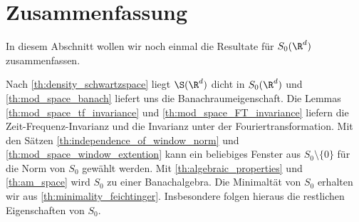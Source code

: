 \section{Zusammenfassung}
In diesem Abschnitt wollen wir noch einmal die Resultate für $ S_0(\R^d) $ zusammenfassen.

Nach \ref{th:density_schwartzspace} liegt $ \S(\R^d) $ dicht in $ S_0(\R^d) $ und \ref{th:mod_space_banach} liefert uns die Banachraumeigenschaft.
Die Lemmas \ref{th:mod_space_tf_invariance} und \ref{th:mod_space_FT_invariance} liefern die Zeit-Frequenz-Invarianz und die Invarianz unter der Fouriertransformation.
Mit den Sätzen \ref{th:independence_of_window_norm} und \ref{th:mod_space_window_extention} kann ein beliebiges Fenster aus $ S_0 \setminus \{ 0\} $ für die Norm von $ S_0 $ gewählt werden.
Mit \ref{th:algebraic_properties} und \ref{th:am_space} wird $ S_0 $ zu einer Banachalgebra.
Die Minimaltät von $ S_0 $ erhalten wir aus \ref{th:minimality_feichtinger}.
Insbesondere folgen hieraus die restlichen Eigenschaften von $ S_0 $.
 




